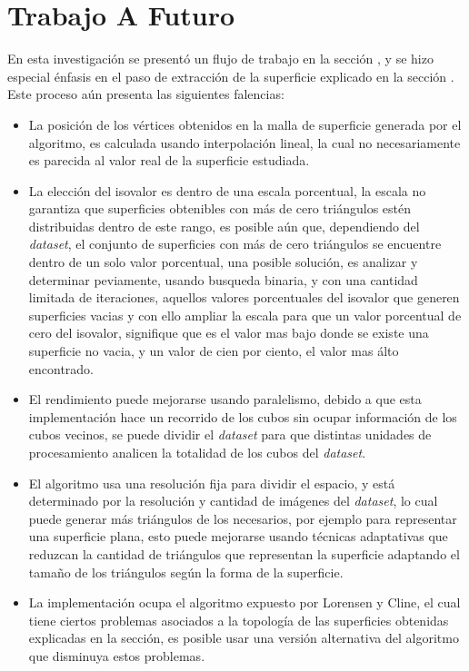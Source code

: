 \chapter{Trabajo A Futuro}
\label{ch:trabajoafuturo}

En esta investigación se presentó un flujo de trabajo en la sección \label{ch:propuesta:sec:flujoDeTrabajo}, y se hizo especial énfasis en el paso de extracción de la superficie explicado en la sección \label{ch:propuesta:sec:extraccionDeLaSuperficie}. Este proceso aún presenta las siguientes falencias:

\begin{itemize}
	\item La posición de los vértices obtenidos en la malla de superficie generada por el algoritmo, es calculada usando interpolación lineal, la cual no necesariamente es parecida al valor real de la superficie estudiada.

	\item La elección del isovalor es dentro de una escala porcentual, la escala no garantiza que superficies obtenibles con más de cero triángulos estén distribuidas dentro de este rango, es posible aún que, dependiendo del \emph{dataset}, el conjunto de superficies con más de cero triángulos se encuentre dentro de un solo valor porcentual, una posible solución, es analizar y determinar peviamente, usando busqueda binaria, y con una cantidad limitada de iteraciones, aquellos valores porcentuales del isovalor que generen superficies vacias y con ello ampliar la escala para que un valor porcentual de cero del isovalor, signifique que es el valor mas bajo donde se existe una superficie no vacia, y un valor de cien por ciento, el valor mas álto encontrado.

	\item El rendimiento puede mejorarse usando paralelismo, debido a que esta implementación hace un recorrido de los cubos sin ocupar información de los cubos vecinos, se puede dividir el \emph{dataset} para que distintas unidades de procesamiento analicen la totalidad de los cubos del \emph{dataset}.

	\item El algoritmo usa una resolución fija para dividir el espacio, y está determinado por la resolución y cantidad de imágenes del \emph{dataset}, lo cual puede generar más triángulos de los necesarios, por ejemplo para representar una superficie plana, esto puede mejorarse usando técnicas adaptativas\cite{Shu95adaptivemarching} que reduzcan la cantidad de triángulos que representan la superficie adaptando el tamaño de los triángulos según la forma de la superficie.

	\item La implementación ocupa el algoritmo expuesto por Lorensen y Cline\cite{Lorensen87marchingcubes}, el cual tiene ciertos problemas asociados a la topología de las superficies obtenidas explicadas en la sección\label{subsec:marchingCubes:consecuencias}, es posible usar una versión alternativa del algoritmo que disminuya estos problemas\cite{Bloomenthal88polygonizationof}\cite{Chernyaev95marchingcubes}\cite{BAPayne90surfacemapping}\cite{Shu95adaptivemarching}.
\end{itemize}